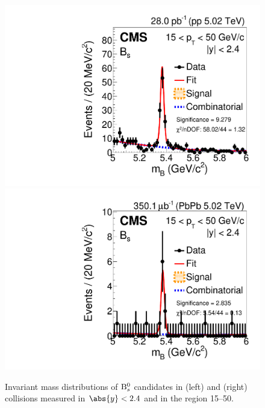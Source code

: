 \begin{figure}[tb]
\centering
\includegraphics[width=.49\textwidth]{plots/data_pp_15_50.pdf}
\includegraphics[width=.49\textwidth]{plots/data_PbPb_15_50.pdf}
\caption{Invariant mass distributions of ${\mathrm{B}_{s}^{0}}$ candidates in \pp (left) and \PbPb (right) collisions measured in $\abs{y}<2.4$ and in the \pt region 15--50\GeVc.} 
\label{fig:rawYieldsBsmeson}
\end{figure}


